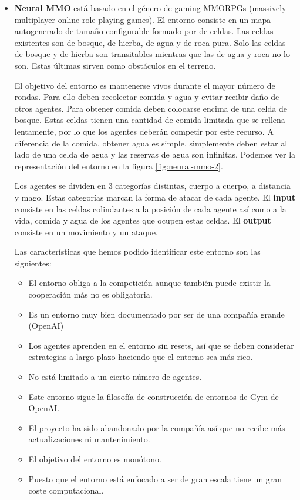 \begin{itemize}
	\item \textbf{Neural MMO} \cite{neural-mmo-repo} está basado en el género de gaming MMORPGs (massively multiplayer online role-playing games). El entorno consiste en un mapa autogenerado de tamaño configurable formado por de celdas. Las celdas existentes son de bosque, de hierba, de agua y de roca pura. Solo las celdas de bosque y de hierba son transitables mientras que las de agua y roca no lo son. Estas últimas sirven como obstáculos en el terreno.  

	      El objetivo del entorno es mantenerse vivos durante el mayor número de rondas. Para ello deben recolectar comida y agua y evitar recibir daño de otros agentes. Para obtener comida deben colocarse encima de una celda de bosque. Estas celdas tienen una cantidad de comida limitada que se rellena lentamente, por lo que los agentes deberán competir por este recurso. A diferencia de la comida, obtener agua es simple, simplemente deben estar al lado de una celda de agua y las reservas de agua son infinitas. Podemos ver la representación del entorno en la figura \ref {fig:neural-mmo-2}.  

	      Los agentes se dividen en 3 categorías distintas, cuerpo a cuerpo, a distancia y mago. Estas categorías marcan la forma de atacar de cada agente.
	      El \textbf{input} consiste en las celdas colindantes a la posición de cada agente así como a la vida, comida y agua de los agentes que ocupen estas celdas. El \textbf{output} consiste en un movimiento y un ataque. 

	      Las características que hemos podido identificar este entorno son las siguientes:
	      \begin{itemize}
		      \item El entorno obliga a la competición aunque también puede existir la cooperación más no es obligatoria.
		      \item Es un entorno muy bien documentado por ser de una compañía grande (OpenAI) \cite {openia}
		      \item Los agentes aprenden en el entorno sin resets, así que se deben considerar estrategias a largo plazo haciendo que el entorno sea más rico.
		      \item No está limitado a un cierto número de agentes.
		      \item Este entorno sigue la filosofía de construcción de entornos de Gym de OpenAI.
		      \item El proyecto ha sido abandonado por la compañía así que no recibe más actualizaciones ni mantenimiento.
		      \item El objetivo del entorno es monótono.
		      \item Puesto que el entorno está enfocado a ser de gran escala tiene un gran coste computacional.
	      \end{itemize}


\end{itemize}
